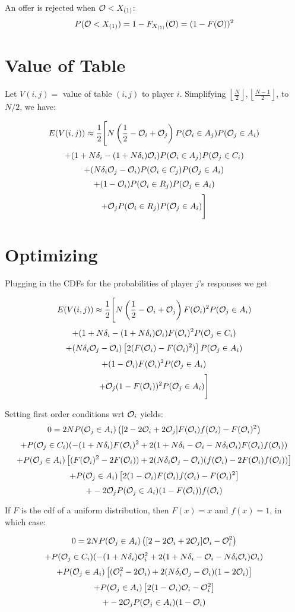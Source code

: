 \documentclass{article}
\begin{document}
An offer is rejected when $\mathcal{O} < X_{(1)}$:
$$P(\mathcal{O} < X_{(1)}) = 1 - F_{X_{(1)}}(\mathcal{O}) = (1 - F(\mathcal{O}))^2$$

\section{Value of Table}

Let $V(i,j) = $ value of table $(i,j)$ to player $i$. Simplifying $\left\lfloor \frac{N}{2} \right\rfloor,\left\lfloor \frac{N-1}{2} \right\rfloor $, to $N/2$, we have:

$$E(V(i,j)) \approx \frac{1}{2}\Bigg[N\left(\frac{1}{2}-\mathcal{O}_i + \mathcal{O}_j\right)P(\mathcal{O}_i \in A_j)P(\mathcal{O}_j \in A_i)$$
$$ + (1 + N\delta_i - (1 + N\delta_i)\mathcal{O}_i)P(\mathcal{O}_i \in A_j)P(\mathcal{O}_j \in C_i)$$
$$+ (N\delta_i \mathcal{O}_j - \mathcal{O}_i)P(\mathcal{O}_i \in C_j)P(\mathcal{O}_j \in A_i)$$
$$ + (1 - \mathcal{O}_i)P(\mathcal{O}_i \in R_j)P(\mathcal{O}_j \in A_i)$$
$$ + \mathcal{O}_jP(\mathcal{O}_i \in R_j)P(\mathcal{O}_j \in A_i)\Bigg]$$

\section{Optimizing}
Plugging in the CDFs for the probabilities of player $j$'s responses we get

$$E(V(i,j)) \approx \frac{1}{2}\Bigg[N\left(\frac{1}{2}-\mathcal{O}_i + \mathcal{O}_j\right)
    F(\mathcal{O}_i)^2P(\mathcal{O}_j \in A_i)$$
$$ + (1 + N\delta_i - (1 + N\delta_i)\mathcal{O}_i) F(\mathcal{O}_i)^2 P(\mathcal{O}_j \in C_i)$$
$$+ (N\delta_i \mathcal{O}_j - \mathcal{O}_i) \left[2(F(\mathcal{O}_i) - F(\mathcal{O}_i)^2)\right] P(\mathcal{O}_j \in A_i)$$
$$ + (1 - \mathcal{O}_i)F(\mathcal{O}_i)^2P(\mathcal{O}_j \in A_i)$$
$$ + \mathcal{O}_j (1 - F(\mathcal{O}_i))^2 P(\mathcal{O}_j \in A_i)\Bigg]$$

Setting first order conditions wrt $\mathcal{O}_i$ yields:
$$0 = 2NP(\mathcal{O}_j \in A_i)\left( [2 - 2\mathcal{O}_i + 2\mathcal{O}_j]F(\mathcal{O}_i)f(\mathcal{O}_i) - F(\mathcal{O}_i)^2 \right)$$
$$ + P(\mathcal{O}_j \in C_i)(-(1 + N\delta_i)F(\mathcal{O}_i)^2 + 2(1 + N\delta_i - \mathcal{O}_i - N\delta_i\mathcal{O}_i)F(\mathcal{O}_i)f(\mathcal{O}_i))$$
$$ + P(\mathcal{O}_j \in A_i)\left[(F(\mathcal{O}_i)^2 - 2F(\mathcal{O}_i)) + 2(N\delta_i\mathcal{O}_j - \mathcal{O}_i)(f(\mathcal{O}_i) - 2F(\mathcal{O}_i)f(\mathcal{O}_i))\right]$$  
$$ + P(\mathcal{O}_j \in A_i)\left[2(1 - \mathcal{O}_i)F(\mathcal{O}_i)f(\mathcal{O}_i) - F(\mathcal{O}_i)^2\right]$$
$$ + -2\mathcal{O}_jP(\mathcal{O}_j \in A_i)(1 - F(\mathcal{O}_i))f(\mathcal{O}_i)$$

If $F$ is the cdf of a uniform distribution, then $F(x) = x$ and $f(x) = 1$, in which case:

$$0 = 2NP(\mathcal{O}_j \in A_i)\left( [2 - 2\mathcal{O}_i + 2\mathcal{O}_j]\mathcal{O}_i - \mathcal{O}_i^2 \right)$$
$$ + P(\mathcal{O}_j \in C_i)(-(1 + N\delta_i)\mathcal{O}_i^2 + 2(1 + N\delta_i - \mathcal{O}_i - N\delta_i\mathcal{O}_i)\mathcal{O}_i)$$
$$ + P(\mathcal{O}_j \in A_i)\left[(\mathcal{O}_i^2 - 2\mathcal{O}_i) + 2(N\delta_i\mathcal{O}_j - \mathcal{O}_i)(1 - 2\mathcal{O}_i)\right]$$  
$$ + P(\mathcal{O}_j \in A_i)\left[2(1 - \mathcal{O}_i)\mathcal{O}_i - \mathcal{O}_i^2\right]$$
$$ + -2\mathcal{O}_jP(\mathcal{O}_j \in A_i)(1 - \mathcal{O}_i)$$
\end{document}
